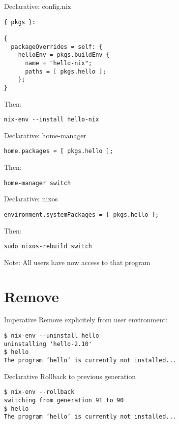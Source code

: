 \documentclass[smaller]{beamer}
\begin{document}
\begin{block}{Declarative: config.nix}
\begin{verbatim}
{ pkgs }:

{
  packageOverrides = self: {
    helloEnv = pkgs.buildEnv {
      name = "hello-nix";
      paths = [ pkgs.hello ];
    };
}
\end{verbatim}

Then:\\
\begin{verbatim}
nix-env --install hello-nix
\end{verbatim}
\end{block}

\begin{block}{Declarative: home-manager}
\begin{verbatim}
home.packages = [ pkgs.hello ];
\end{verbatim}

Then:\\
\begin{verbatim}
home-manager switch
\end{verbatim}
\end{block}

\begin{block}{Declarative: nixos}
\begin{verbatim}
environment.systemPackages = [ pkgs.hello ];
\end{verbatim}

Then:\\
\begin{verbatim}
sudo nixos-rebuild switch
\end{verbatim}

Note: All users have now access to that program\\
\end{block}

\section{Remove}
\label{sec:orgc41711c}
\begin{block}{Imperative}
Remove explicitely from user environment:\\

\begin{verbatim}
$ nix-env --uninstall hello
uninstalling 'hello-2.10'
$ hello
The program ‘hello’ is currently not installed...
\end{verbatim}
\end{block}

\begin{block}{Declarative}
Rollback to previous generation\\

\begin{verbatim}
$ nix-env --rollback
switching from generation 91 to 90
$ hello
The program ‘hello’ is currently not installed...
\end{verbatim}
\end{block}
\end{document}
